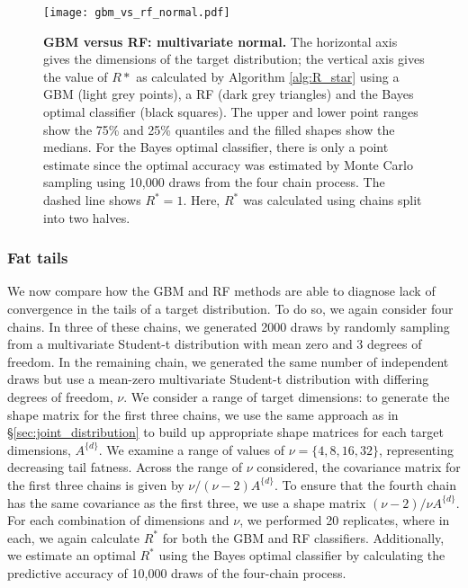 \documentclass{article}
\begin{document}
\begin{figure}[!htb]
	\centerline{\texttt{[image: gbm\_vs\_rf\_normal.pdf]}}
	\caption{\textbf{GBM versus RF: multivariate normal.} The horizontal axis gives the dimensions of the target distribution; the vertical axis gives the value of $R*$ as calculated by Algorithm \ref{alg:R_star} using a GBM (light grey points), a RF (dark grey triangles) and the Bayes optimal classifier (black squares). The upper and lower point ranges show the 75\% and 25\% quantiles and the filled shapes show the medians. For the Bayes optimal classifier, there is only a point estimate since the optimal accuracy was estimated by Monte Carlo sampling using 10,000 draws from the four chain process. The dashed line shows $R^*=1$. Here, $R^*$ was calculated using chains split into two halves.}
	\label{fig:gbm_vs_rf_normal}
\end{figure}

\subsubsection{Fat tails}\label{sec:tail_fatness}
We now compare how the GBM and RF methods are able to diagnose lack of convergence in the tails of a target distribution. To do so, we again consider four chains. In three of these chains, we generated 2000 draws by randomly sampling from a multivariate Student-t distribution with mean zero and 3 degrees of freedom. In the remaining chain, we generated the same number of independent draws but use a mean-zero multivariate Student-t distribution with differing degrees of freedom, $\nu$. We consider a range of target dimensions: to generate the shape matrix for the first three chains, we use the same approach as in \S\ref{sec:joint_distribution} to build up appropriate shape matrices for each target dimensions, $A^{\{d\}}$. We examine a range of values of $\nu=\{4, 8, 16, 32\}$, representing decreasing tail fatness. Across the range of $\nu$ considered, the covariance matrix for the first three chains is given by $\nu/{(\nu-2)} A^{\{d\}}$. To ensure that the fourth chain has the same covariance as the first three, we use a shape matrix ${(\nu-2)}/\nu A^{\{d\}}$. For each combination of dimensions and $\nu$, we performed 20 replicates, where in each, we again calculate $R^*$ for both the GBM and RF classifiers. Additionally, we estimate an optimal $R^*$ using the Bayes optimal classifier by calculating the predictive accuracy of 10,000 draws of the four-chain process.
\end{document}
